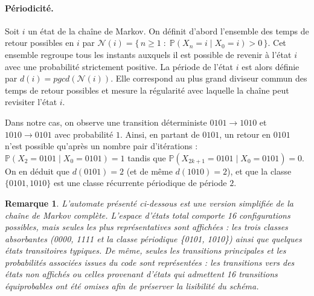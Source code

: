 \documentclass[11pt,a4paper]{article}
\newtheorem*{remark}{Remarque}
\begin{document}
\paragraph{Périodicité.}
Soit $i$ un état de la chaîne de Markov.
On définit d’abord l’ensemble des temps de retour possibles en $i$ par
$
\mathcal{N}(i)=\{\,n \ge 1 \;:\; \mathbb{P}(X_n = i \mid X_0 = i) > 0\,\}
$.
Cet ensemble regroupe tous les instants auxquels il est possible de
revenir à l’état $i$ avec une probabilité strictement positive.  La
période de l’état $i$ est alors définie par
$d(i)=pgcd(\mathcal{N}(i))$. Elle correspond au plus grand diviseur
commun des temps de retour possibles et mesure la régularité avec
laquelle la chaîne peut revisiter l’état $i$.

Dans notre cas, on observe une transition déterministe $0101\to 1010$
et $1010\to 0101$ avec probabilité $1$.  Ainsi, en partant de $0101$,
un retour en $0101$ n'est possible qu'après un nombre pair
d'itérations : $\mathbb{P}(X_{2}=0101\mid X_0=0101)=1$ tandis que
$\mathbb{P}(X_{2k+1}=0101\mid X_0=0101)=0$.  On en déduit que
$d(0101)=2$ (et de même $d(1010)=2$), et que la classe $\{0101,1010\}$
est une classe récurrente périodique de période $2$.
\\

\begin{remark}
L’automate présenté ci-dessous est une version simplifiée de la chaîne
de Markov complète.  L’espace d’états total comporte 16 configurations
possibles, mais seules les plus représentatives sont affichées : les
trois classes absorbantes (0000, 1111 et la classe périodique \{0101,
1010\}) ainsi que quelques états transitoires typiques.  De même,
seules les transitions principales et les probabilités associées
issues du code sont représentées : les transitions vers des états non
affichés ou celles provenant d’états qui admettent 16 transitions
équiprobables ont été omises afin de préserver la lisibilité du
schéma.
\end{remark}
\end{document}
